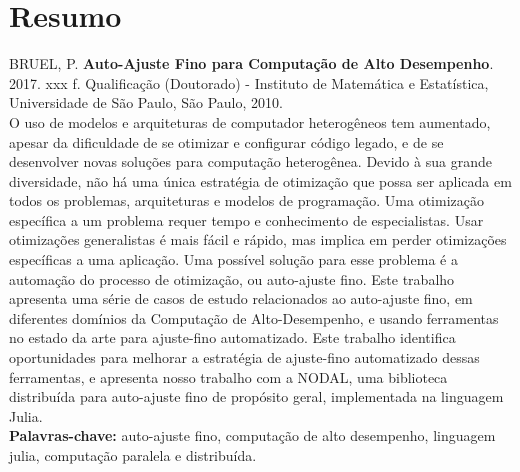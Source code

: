 \documentclass[12pt,twoside,a4paper]{book}
\begin{document}



\chapter*{Resumo}

\noindent BRUEL, P. \textbf{Auto-Ajuste Fino para Computação de Alto Desempenho}.
2017. xxx f.
Qualificação (Doutorado) - Instituto de Matemática e Estatística,
Universidade de São Paulo, São Paulo, 2010.
\\
O uso de modelos e arquiteturas de computador heterogêneos tem aumentado,
apesar da dificuldade de se otimizar e configurar código legado, e de se
desenvolver novas soluções para computação heterogênea.  Devido à sua grande
diversidade, não há uma única estratégia de otimização que possa ser aplicada
em todos os problemas, arquiteturas e modelos de programação.
Uma otimização específica a um problema requer tempo e conhecimento de
especialistas. Usar otimizações generalistas é mais fácil e rápido,
mas implica em perder otimizações específicas a uma aplicação.
Uma possível solução para esse problema é a automação do processo
de otimização, ou auto-ajuste fino.
Este trabalho apresenta uma série de casos de estudo relacionados ao
auto-ajuste fino, em diferentes domínios da Computação de Alto-Desempenho,
e usando ferramentas no estado da arte para ajuste-fino automatizado.
Este trabalho identifica oportunidades para melhorar a estratégia
de ajuste-fino automatizado dessas ferramentas, e apresenta nosso
trabalho com a NODAL, uma biblioteca distribuída para auto-ajuste
fino de propósito geral, implementada na linguagem Julia.
\\

\noindent \textbf{Palavras-chave:} auto-ajuste fino, computação de alto desempenho, linguagem julia, computação paralela e distribuída.
\end{document}
